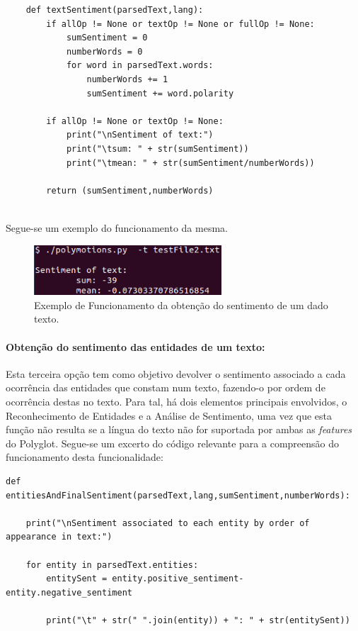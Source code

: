 \documentclass{article}
\begin{document}
\begin{verbatim}
    def textSentiment(parsedText,lang):
        if allOp != None or textOp != None or fullOp != None:
            sumSentiment = 0
            numberWords = 0
            for word in parsedText.words:
                numberWords += 1
                sumSentiment += word.polarity
    
        if allOp != None or textOp != None:
            print("\nSentiment of text:")
            print("\tsum: " + str(sumSentiment))
            print("\tmean: " + str(sumSentiment/numberWords))

        return (sumSentiment,numberWords)
        
\end{verbatim}

Segue-se um exemplo do funcionamento da mesma.

\begin{figure}[H]
\begin{center}
    \includegraphics[width = 7cm, keepaspectratio]{Pictures/t.png}
    \caption{Exemplo de Funcionamento da obtenção do sentimento de um dado texto. }
    \label{fig:toption}
\end{center}
\end{figure}

\paragraph{Obtenção do sentimento das entidades de um texto:} Esta terceira opção tem como objetivo devolver o sentimento associado a cada ocorrência das entidades que constam num texto, fazendo-o por ordem de ocorrência destas no texto. Para tal, há dois elementos principais envolvidos, o Reconhecimento de Entidades e a Análise de Sentimento, uma vez que esta função não resulta se a língua do texto não for suportada por ambas as \textit{features} do Polyglot.
Segue-se um excerto do código relevante para a compreensão do funcionamento desta funcionalidade:
\begin{verbatim}
def entitiesAndFinalSentiment(parsedText,lang,sumSentiment,numberWords):

    print("\nSentiment associated to each entity by order of appearance in text:")
    
    for entity in parsedText.entities:
        entitySent = entity.positive_sentiment-entity.negative_sentiment

        print("\t" + str(" ".join(entity)) + ": " + str(entitySent))
\end{verbatim}
\end{document}
